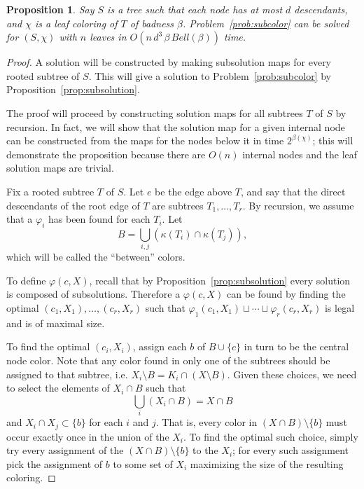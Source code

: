 \documentclass{amsart}
\newcommand{\col}{\chi}
\newcommand{\subunion}{\sqcup}
\newcommand{\cut}{\kappa}
\newcommand{\bad}{\beta}
\newtheorem{prop}{Proposition}
\begin{document}
\begin{prop}
\label{prop:FPT}
Say $S$ is a tree such that each node has at most $d$ descendants, and $\col$ is a leaf coloring of $T$ of badness $\beta$.
Problem~\ref{prob:subcolor} can be solved for $(S, \col)$ with $n$ leaves in $O(n \, d^3 \, \bad \, Bell(\bad))$ time.
\end{prop}

\begin{proof}

A solution will be constructed by making subsolution maps for every rooted subtree of $S$.
This will give a solution to Problem~\ref{prob:subcolor} by Proposition~\ref{prop:subsolution}.

The proof will proceed by constructing solution maps for all subtrees $T$ of $S$ by recursion.
In fact, we will show that the solution map for a given internal node can be constructed from the maps for the nodes below it in time $2^{\bad(\col)}$;
this will demonstrate the proposition because there are $O(n)$ internal nodes and the leaf solution maps are trivial.

Fix a rooted subtree $T$ of $S$.
Let $e$ be the edge above $T$, and say that the direct descendants of the root edge of $T$ are subtrees $T_1,\ldots,T_r$.
By recursion, we assume that a $\varphi_i$ has been found for each $T_i$.
Let
\[
  B = \bigcup_{i,j} \left( \cut(T_i) \cap \cut(T_j) \right),
\]
which will be called the ``between'' colors.

To define $\varphi(c,X)$, recall that by Proposition~\ref{prop:subsolution} every solution is composed of subsolutions.
Therefore a $\varphi(c,X)$ can be found by finding the optimal $(c_1,X_1),\ldots,(c_r,X_r)$ such that $\varphi_1(c_1,X_1) \subunion \cdots \subunion \varphi_r(c_r,X_r)$ is legal and is of maximal size.

To find the optimal $(c_i, X_i)$, assign each $b$ of $B \cup \{c\}$ in turn to be the central node color.
Note that any color found in only one of the subtrees should be assigned to that subtree, i.e. $X_i \setminus B = K_i \cap (X \setminus B)$.
Given these choices, we need to select the elements of $X_i \cap B$ such that
\[
  \bigcup_{i} (X_i \cap B) = X \cap B
\]
and $X_i \cap X_j \subset \{b\}$ for each $i$ and $j$.
That is, every color in $(X \cap B) \setminus \{b\}$ must occur exactly once in the union of the $X_i$.
To find the optimal such choice, simply try every assignment of the $(X \cap B) \setminus \{b\}$ to the $X_i$; for every such assignment pick the assignment of $b$ to some set of $X_i$ maximizing the size of the resulting coloring.


\end{proof}
\end{document}
